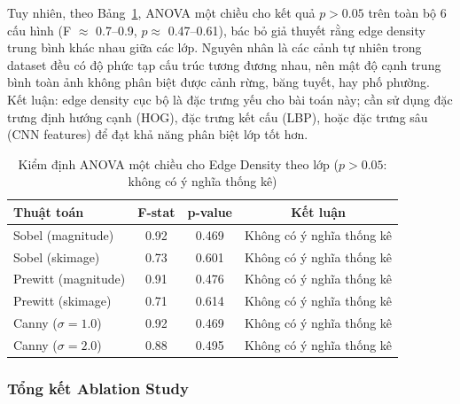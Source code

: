 Tuy nhiên, theo Bảng~\ref{tab:anova_edge}, ANOVA một chiều cho kết quả $p > 0.05$ trên toàn bộ 6 cấu hình (F $\approx$ 0.7--0.9, $p \approx$ 0.47--0.61), bác bỏ giả thuyết rằng edge density trung bình khác nhau giữa các lớp. Nguyên nhân là các cảnh tự nhiên trong dataset đều có độ phức tạp cấu trúc tương đương nhau, nên mật độ cạnh trung bình toàn ảnh không phân biệt được cảnh rừng, băng tuyết, hay phố phường. Kết luận: edge density cục bộ là đặc trưng yếu cho bài toán này; cần sử dụng đặc trưng định hướng cạnh (HOG), đặc trưng kết cấu (LBP), hoặc đặc trưng sâu (CNN features) để đạt khả năng phân biệt lớp tốt hơn.
\begin{table}[H]
    \centering
    \begin{tabular}{|l|c|c|c|}
        \hline
        \textbf{Thuật toán}  & \textbf{F-stat} & \textbf{p-value} & \textbf{Kết luận}         \\
        \hline
        Sobel (magnitude)    & 0.92            & 0.469            & Không có ý nghĩa thống kê \\
        \hline
        Sobel (skimage)      & 0.73            & 0.601            & Không có ý nghĩa thống kê \\
        \hline
        Prewitt (magnitude)  & 0.91            & 0.476            & Không có ý nghĩa thống kê \\
        \hline
        Prewitt (skimage)    & 0.71            & 0.614            & Không có ý nghĩa thống kê \\
        \hline
        Canny ($\sigma=1.0$) & 0.92            & 0.469            & Không có ý nghĩa thống kê \\
        \hline
        Canny ($\sigma=2.0$) & 0.88            & 0.495            & Không có ý nghĩa thống kê \\
        \hline
    \end{tabular}
    \caption{Kiểm định ANOVA một chiều cho Edge Density theo lớp ($p > 0.05$: không có ý nghĩa thống kê)}
    \label{tab:anova_edge}
\end{table}

\subsubsection{Tổng kết Ablation Study}

